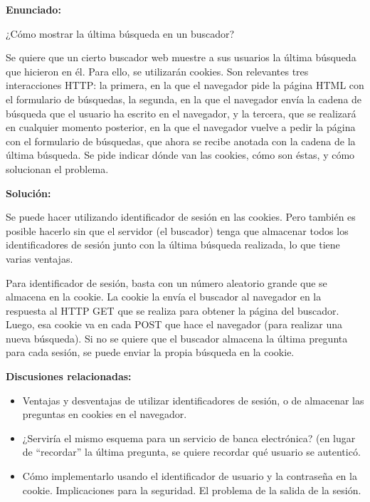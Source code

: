 \textbf{Enunciado:}

¿Cómo mostrar la última búsqueda en un  buscador?

Se quiere que un cierto buscador web muestre a sus usuarios la última búsqueda que hicieron en él. Para ello, se utilizarán cookies. Son relevantes tres interacciones HTTP: la primera, en la que el navegador pide la página HTML con el formulario de búsquedas, la segunda, en la que el navegador envía la cadena de búsqueda que el usuario ha escrito en el navegador, y la tercera, que se realizará en cualquier momento posterior, en la que el navegador vuelve a pedir la página con el formulario de búsquedas, que ahora se recibe anotada con la cadena de la última búsqueda. Se pide indicar dónde van las cookies, cómo son éstas, y cómo solucionan el problema.

\textbf{Solución:}

Se puede hacer utilizando identificador de sesión en las cookies. Pero también es posible hacerlo sin que el servidor (el buscador) tenga que almacenar todos los identificadores de sesión  junto con la última búsqueda realizada, lo que tiene varias ventajas.

Para identificador de sesión, basta con un número aleatorio grande que se almacena en la cookie. La cookie la envía el buscador al navegador en la respuesta al HTTP GET que se realiza para obtener la página del buscador. Luego, esa cookie va en cada POST que hace el navegador (para realizar una nueva búsqueda). Si no se quiere que el buscador almacena la última pregunta para cada sesión, se puede enviar la propia búsqueda en la cookie.   

\textbf{Discusiones relacionadas:}

\begin{itemize}
\item Ventajas y desventajas de utilizar identificadores de sesión, o de almacenar las preguntas en cookies en el navegador.
\item ¿Serviría el mismo esquema para un servicio de banca electrónica? (en lugar de ``recordar'' la última pregunta, se quiere recordar qué usuario se autenticó.
\item Cómo implementarlo usando el identificador de usuario y la contraseña en la cookie. Implicaciones para la seguridad. El problema de la salida de la sesión.
\end{itemize}

